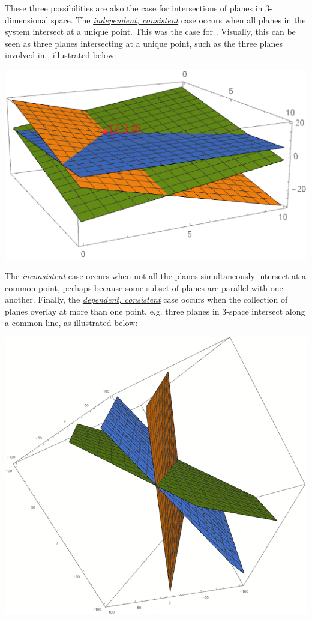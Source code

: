  These three possibilities are also the case for intersections of planes in 3-dimensional space. The \hyperref[def:consistent]{\emph{independent, consistent}} case occurs when all planes in the system intersect at a unique point. This was the case for . Visually, this can be seen as three planes intersecting at a unique point, such as the three planes involved in , illustrated below:
\begin{center} \includegraphics[scale=.25]{Chapter1/images/1-1firstthree.png} \end{center}%
The \hyperref[def:consistent]{\emph{inconsistent}} case occurs when not all the planes simultaneously intersect at a common point, perhaps because some subset of planes are parallel with one another. Finally, the \hyperref[def:consistent]{\emph{dependent, consistent}} case occurs when the collection of planes overlay at more than one point, e.g. three planes in 3-space intersect along a common line, as illustrated below: 
\begin{center} \includegraphics[scale=.35]{Chapter1/images/1-1secondthree.png} \end{center}%
